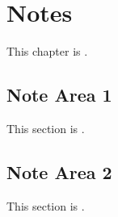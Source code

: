 
\chapter{Notes}
\label{loc:Notes}


This chapter is \TBD.

\section{Note Area 1}
\label{loc:Notes_1}


This section is \TBD.

\section{Note Area 2}
\label{loc:Notes_2}


This section is \TBD.